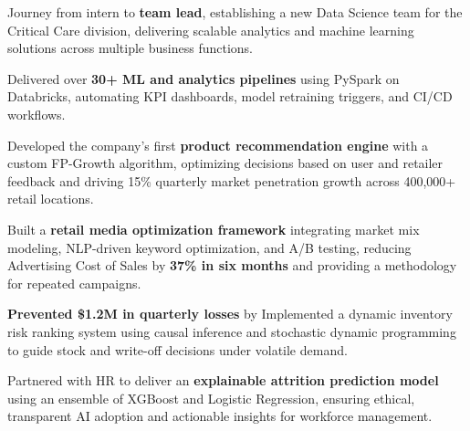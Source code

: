 \documentclass[letterpaper,11pt]{article}
\newcommand{\resumeItem}[1]{
  \item{\small{#1}}
}
\begin{document}
    








    \resumeItem{Journey from intern to \textbf{team lead}, establishing a new Data Science team for the Critical Care division, delivering scalable analytics and machine learning solutions across multiple business functions.}


\resumeItem{Delivered over \textbf{30+ ML and analytics pipelines} using PySpark on Databricks, automating KPI dashboards, model retraining triggers, and CI/CD workflows.}

\resumeItem{Developed the company’s first \textbf{product recommendation engine} with a custom FP-Growth algorithm, optimizing decisions based on user and retailer feedback and driving 15\% quarterly market penetration growth across 400,000+ retail locations.}

\resumeItem{Built a \textbf{retail media optimization framework} integrating market mix modeling, NLP-driven keyword optimization, and A/B testing, reducing Advertising Cost of Sales by \textbf{37\% in six months} and providing a methodology for repeated campaigns.}





\resumeItem{\textbf{Prevented \$1.2M in quarterly losses} by Implemented a dynamic inventory risk ranking system using causal inference and stochastic dynamic programming to guide stock and write-off decisions under volatile demand.}

\resumeItem{Partnered with HR to deliver an \textbf{explainable attrition prediction model} using an ensemble of XGBoost and Logistic Regression, ensuring ethical, transparent AI adoption and actionable insights for workforce management.}
\end{document}
